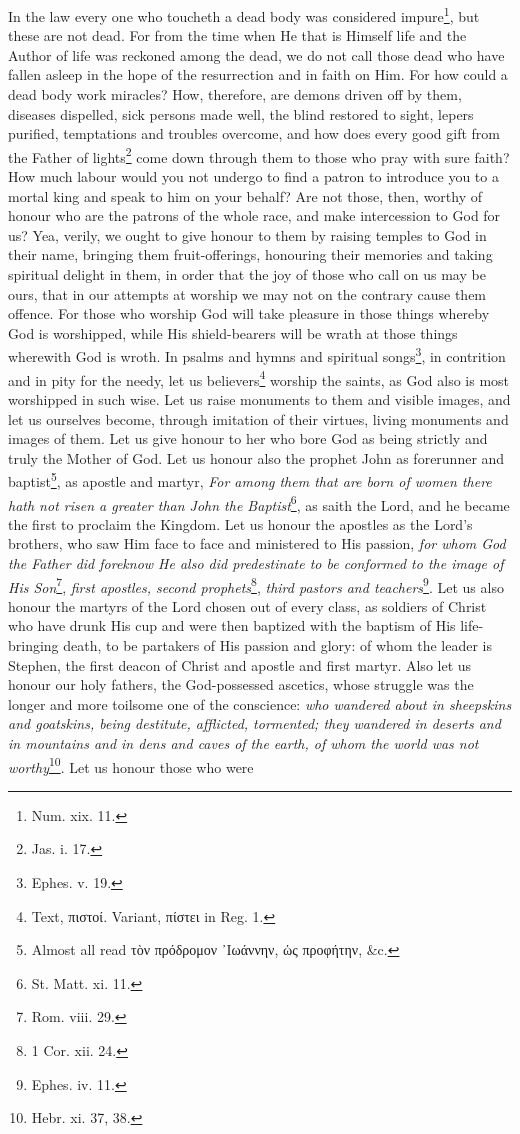 In the law every one who toucheth a dead body was considered impure\footnote{Num. xix. 11.}, but these are not dead. For from the time when He that is Himself life and the Author of life was reckoned among the dead, we do not call those dead who have fallen asleep in the hope of the resurrection and in faith on Him. For how could a dead body work miracles? How, therefore, are demons driven off by them, diseases dispelled, sick persons made well, the blind restored to sight, lepers purified, temptations and troubles overcome, and how does every good gift from the Father of lights\footnote{Jas. i. 17.} come down through them to those who pray with sure faith? How much labour would you not undergo to find a patron to introduce you to a mortal king and speak to him on your behalf? Are not those, then, worthy of honour who are the patrons of the whole race, and make intercession to God for us? Yea, verily, we ought to give honour to them by raising temples to God in their name, bringing them fruit-offerings, honouring their memories and taking spiritual delight in them, in order that the joy of those who call on us may be ours, that in our attempts at worship we may not on the contrary cause them offence. For those who worship God will take pleasure in those things whereby God is worshipped, while His shield-bearers will be wrath at those things wherewith God is wroth. In psalms and hymns and spiritual songs\footnote{Ephes. v. 19.}, in contrition and in pity for the needy, let us believers\footnote{Text, \textgreek{πιστοί}. Variant, \textgreek{πίστει} in Reg. 1.} worship the saints, as God also is most worshipped in such wise. Let us raise monuments to them and visible images, and let us ourselves become, through imitation of their virtues, living monuments and images of them. Let us give honour to her who bore God as being strictly and truly the Mother of God. Let us honour also the prophet John as forerunner and baptist\footnote{Almost all read \textgreek{τὸν πρόδρομον ᾽Ιωάννην, ὡς προφήτην}, \&c.}, as apostle and martyr, \emph{For among them that are born of women there hath not risen a greater than John the Baptist}\footnote{St. Matt. xi. 11.}, as saith the Lord, and he became the first to proclaim the Kingdom. Let us honour the apostles as the Lord’s brothers, who saw Him face to face and ministered to His passion, \emph{for whom God the Father did foreknow He also did predestinate to be conformed to the image of His Son}\footnote{Rom. viii. 29.}, \emph{first apostles, second prophets}\footnote{1 Cor. xii. 24.}, \emph{third pastors and teachers}\footnote{Ephes. iv. 11.}. Let us also honour the martyrs of the Lord chosen out of every class, as soldiers of Christ who have drunk His cup and were then baptized with the baptism of His life-bringing death, to be partakers of His passion and glory: of whom the leader is Stephen, the first deacon of Christ and apostle and first martyr. Also let us honour our holy fathers, the God-possessed ascetics, whose struggle was the longer and more toilsome one of the conscience: \emph{who wandered about in sheepskins and goatskins, being destitute, afflicted, tormented; they wandered in deserts and in mountains and in dens and caves of the earth, of whom the world was not worthy}\footnote{Hebr. xi. 37, 38.}. Let us honour those who were 